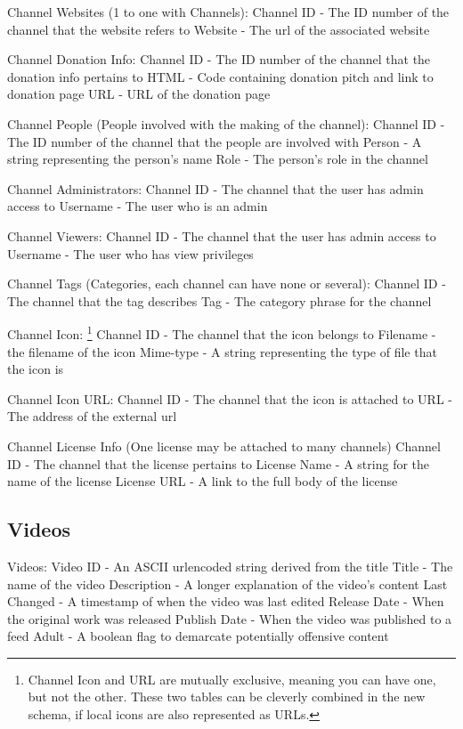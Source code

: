 \documentclass[a4paper,12pt]{report}
\begin{document}
Channel Websites (1 to one with Channels):
	Channel ID - The ID number of the channel that the website refers to
	Website - The url of the associated website

Channel Donation Info:
	Channel ID - The ID number of the channel that the donation info pertains to
	HTML - Code containing donation pitch and link to donation page
	URL - URL of the donation page

Channel People (People involved with the making of the channel):
	Channel ID - The ID number of the channel that the people are involved with
	Person - A string representing the person's name
	Role - The person's role in the channel

Channel Administrators:
	Channel ID - The channel that the user has admin access to
	Username - The user who is an admin

Channel Viewers:
	Channel ID - The channel that the user has admin access to
	Username - The user who has view privileges

Channel Tags (Categories, each channel can have none or several):
	Channel ID - The channel that the tag describes
	Tag - The category phrase for the channel

Channel Icon:
\footnote{Channel Icon and URL are mutually exclusive, meaning you can have one, but not the other. These two tables can be cleverly combined in the new schema, if local icons are also represented as URLs.}
	Channel ID - The channel that the icon belongs to
	Filename - the filename of the icon
	Mime-type - A string representing the type of file that the icon is

Channel Icon URL:
	Channel ID - The channel that the icon is attached to
	URL - The address of the external url

Channel License Info (One license may be attached to many channels)
	Channel ID - The channel that the license pertains to
	License Name - A string for the name of the license
	License URL - A link to the full body of the license

\subsection{Videos}
Videos: 
	Video ID - An ASCII urlencoded string derived from the title
	Title - The name of the video
	Description - A longer explanation of the video's content
	Last Changed - A timestamp of when the video was last edited
	Release Date - When the original work was released
	Publish Date - When the video was published to a feed
	Adult - A boolean flag to demarcate potentially offensive content	
\end{document}

